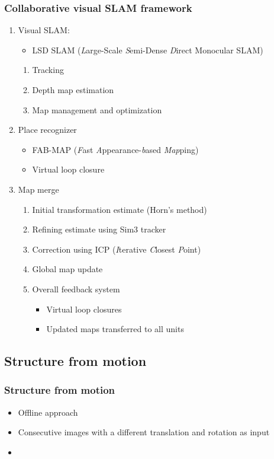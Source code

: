 \documentclass{beamerthesis}
\newcommand{\aemph}[1]{\color{color5}\emph{#1}\hspace{0.1em}\color{color2}}
\begin{document}
\begin{frame}\frametitle{Collaborative visual SLAM framework}
	\subtitle{Algorithm}
	\begin{enumerate}
		\item Visual SLAM:
		\begin{itemize}
			\item LSD SLAM (\aemph{L}arge-Scale \aemph{S}emi-Dense \aemph{D}irect Monocular SLAM)
		\end{itemize}
		\begin{enumerate}
			\item Tracking
			\item Depth map estimation
			\item Map management and optimization
		\end{enumerate}
		\item Place recognizer
		\begin{itemize}
			\item FAB-MAP (\aemph{F}ast \aemph{A}ppearance-\aemph{b}ased \aemph{Map}ping)
			\item Virtual loop closure
		\end{itemize}
		\item Map merge
		\begin{enumerate}
			\item Initial transformation estimate (Horn's method)
			\item Refining estimate using Sim3 tracker
			\item Correction using ICP (\aemph{I}terative \aemph{C}losest \aemph{P}oint)
			\item Global map update
	\newpage
		\item Overall feedback system
		\begin{itemize}
			\item Virtual loop closures
			\item Updated maps transferred to all units
		\end{itemize}
		\end{enumerate}
	\end{enumerate}
\end{frame}

\subsection{Structure from motion}
\begin{frame}\frametitle{Structure from motion}
	\begin{itemize}
		\item Offline approach
		\item Consecutive images with a different translation and rotation as input
		\item
	\end{itemize}
\end{frame}
\end{document}
